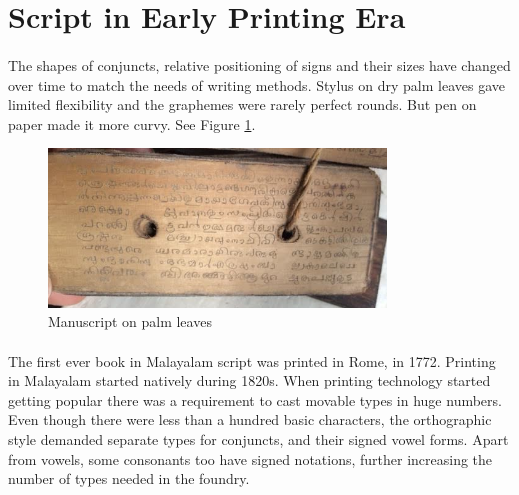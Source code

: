 \documentclass[10pt]{article}
\begin{document}
\section{Script in Early Printing Era}

\paragraph{}
The shapes of conjuncts, relative positioning of signs and their sizes have changed over time to match the needs of writing methods. Stylus on dry palm leaves gave limited flexibility and the graphemes were rarely perfect rounds. But pen on paper made it more curvy. See Figure \ref{palmleaves}.

\begin{figure}[h!]
	\centering
	\includegraphics[width=0.8\textwidth]{images/manuscipt.png}
	\caption{Manuscript on palm leaves}
	\label{palmleaves}
\end{figure} 

\paragraph{}
The first ever book in Malayalam script was printed in Rome, in 1772. Printing in Malayalam started natively during 1820s\cite{babucherian}. When printing technology started getting popular there was a requirement to cast movable types in huge numbers. Even though there were less than a hundred basic characters, the orthographic style demanded separate types for conjuncts, and their signed vowel forms. Apart from vowels, some consonants too have signed notations, further increasing the number of types needed in the foundry. 
\end{document}
